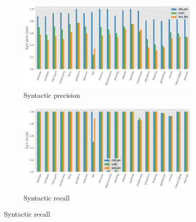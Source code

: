 
\begin{figure}[htbp]
\label{fix:exp-results}
  \centering

  \begin{subfigure}[b]{0.45\textwidth}
    \includegraphics[width=\textwidth]{figures/syn_precision.png}
    \caption{Syntactic precision}
  \end{subfigure}
  \hfill
  \begin{subfigure}[b]{0.45\textwidth}
    \includegraphics[width=\textwidth]{figures/syn_recall.png}
    \caption{Syntactic recall}
  \end{subfigure}

  \vspace{1em}


\end{figure}
